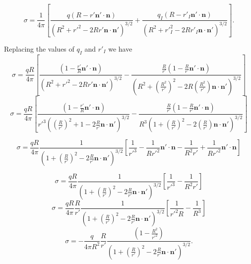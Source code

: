  \begin{equation}
 \sigma =  \frac{1}{4 \pi } \left[  \frac{q (R  - r' \textbf{n}' \cdot \textbf{n})}{\left(R^2 + r'^2 - 2 Rr' \textbf{n} \cdot \textbf{n}' \right)^{3/2} } + \frac{q_I (R  - r'_I \textbf{n}'\cdot \textbf{n}) }{\left(R^2 + r'^2_I - 2 Rr'_I \textbf{n} \cdot \textbf{n}' \right)^{3/2}} \right].  
 \end{equation} 
 
Replacing the values of $q_I$ and $r'_I$ we have
\begin{equation}
 \sigma =  \frac{qR}{4 \pi } \left[  \frac{ (1  - \frac{r'}{R} \textbf{n}' \cdot \textbf{n}) }{\left(R^2 + r'^2 - 2 Rr' \textbf{n} \cdot \textbf{n}' \right)^{3/2} } - \frac{\frac{R}{r'} (1  - \frac{R}{r'} \textbf{n}'\cdot \textbf{n}) }{\left(R^2 + \left( \frac{R^2}{r'} \right)^2 - 2 R \left( \frac{R^2}{r'} \right)  \textbf{n} \cdot \textbf{n}' \right)^{3/2}} \right]  
 \end{equation} 
\begin{equation}
 \sigma =  \frac{qR}{4 \pi } \left[  \frac{ (1  - \frac{r'}{R} \textbf{n}' \cdot \textbf{n}) }{r'^3 \left(\left(\frac{R}{r'}\right)^2 + 1 - 2 \frac{R}{r'} \textbf{n} \cdot \textbf{n}' \right)^{3/2} } - \frac{\frac{R}{r'} (1  - \frac{R}{r'} \textbf{n}'\cdot \textbf{n}) }{R^3 \left(1 + \left( \frac{R}{r'} \right)^2 - 2  \left( \frac{R}{r'} \right)  \textbf{n} \cdot \textbf{n}' \right)^{3/2}} \right]
 \end{equation} 
 
 \begin{equation}
 \sigma =  \frac{qR}{4 \pi } \frac{ 1 }{ \left( 1+ \left(\frac{R}{r'}\right)^2 - 2 \frac{R}{r'} \textbf{n} \cdot \textbf{n}' \right)^{3/2} } \left[  \frac{ 1 }{r'^3 } - \frac{1}{Rr'^2} \textbf{n}' \cdot \textbf{n} - \frac{1 }{R^2 r'} + \frac{1}{Rr'^2} \textbf{n}' \cdot \textbf{n} \right]  
 \end{equation} 
 
\begin{equation}
 \sigma =  \frac{qR}{4 \pi } \frac{ 1 }{ \left( 1+ \left(\frac{R}{r'}\right)^2 - 2 \frac{R}{r'} \textbf{n} \cdot \textbf{n}' \right)^{3/2} } \left[  \frac{ 1 }{r'^3 } - \frac{1 }{R^2 r'} \right]  
 \end{equation} 
 \begin{equation}
 \sigma =  \frac{qR}{4 \pi } \frac{R}{r'} \frac{ 1 }{ \left( 1+ \left(\frac{R}{r'}\right)^2 - 2 \frac{R}{r'} \textbf{n} \cdot \textbf{n}' \right)^{3/2} } \left[  \frac{ 1 }{r'^2 R } - \frac{1 }{R^3} \right] 
 \end{equation} 
  \begin{equation}
 \sigma = - \frac{q}{4 \pi R^2 } \frac{R}{r'} \frac{ \left(  1- \frac{ R^2}{r'^2  }  \right) }{ \left( 1+ \left(\frac{R}{r'}\right)^2 - 2 \frac{R}{r'} \textbf{n} \cdot \textbf{n}' \right)^{3/2} } .  
 \end{equation} 
 
